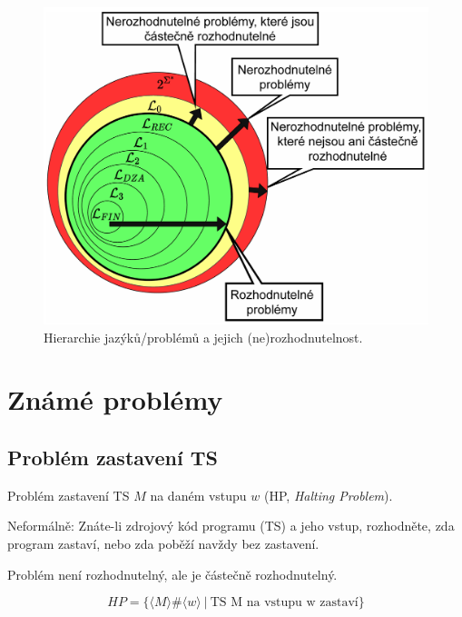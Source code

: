 
\begin{figure}[H]
    \centering
    \includegraphics[width=0.9\linewidth]{fj_hierarchy.pdf}
    \caption{Hierarchie jazýků/problémů a jejich (ne)rozhodnutelnost.}
\end{figure}


\section{Známé problémy}

\subsection*{Problém zastavení TS}

\begin{compactitem}
    \item Problém zastavení TS $M$ na daném vstupu $w$ (HP, \textit{Halting Problem}).

    \item Neformálně: Znáte-li zdrojový kód programu (TS) a jeho vstup, rozhodněte, zda program zastaví, nebo zda poběží navždy bez zastavení.

    \item Problém není rozhodnutelný, ale je částečně rozhodnutelný.
\end{compactitem}

$$ HP = \{ \langle M \rangle \# \langle w \rangle ~|~ \text{TS M na vstupu w zastaví} \} $$

